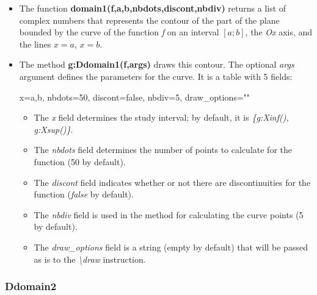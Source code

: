 \begin{itemize}
    \item The function \textbf{domain1(f,a,b,nbdots,discont,nbdiv)} returns a list of complex numbers that represents the contour of the part of the plane bounded by the curve of the function \emph{f} on an interval \([a;b]\), the \emph{Ox} axis, and the lines \(x=a\), \(x=b\).

    \item The method \textbf{g:Ddomain1(f,args)} draws this contour. The optional \emph{args} argument defines the parameters for the curve. It is a table with 5 fields:

\begin{TeXcode}
{ x={a,b}, nbdots=50, discont=false, nbdiv=5, draw_options="" }
\end{TeXcode}

\begin{itemize}
    \item The \emph{x} field determines the study interval; by default, it is \emph{\{g:Xinf(), g:Xsup()\}}.
    \item The \emph{nbdots} field determines the number of points to calculate for the function (50 by default).
    \item The \emph{discont} field indicates whether or not there are discontinuities for the function (\emph{false} by default).     \item The \emph{nbdiv} field is used in the method for calculating the curve points (5 by default).
    \item The \emph{draw\_options} field is a string (empty by default) that will be passed as is to the \emph{\textbackslash draw} instruction.
\end{itemize}
\end{itemize}

\subsubsection{Ddomain2}

